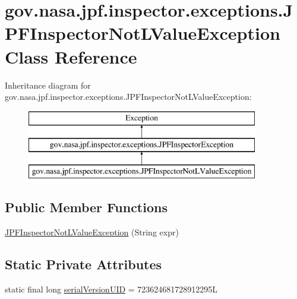 \hypertarget{classgov_1_1nasa_1_1jpf_1_1inspector_1_1exceptions_1_1_j_p_f_inspector_not_l_value_exception}{}\section{gov.\+nasa.\+jpf.\+inspector.\+exceptions.\+J\+P\+F\+Inspector\+Not\+L\+Value\+Exception Class Reference}
\label{classgov_1_1nasa_1_1jpf_1_1inspector_1_1exceptions_1_1_j_p_f_inspector_not_l_value_exception}
Inheritance diagram for gov.\+nasa.\+jpf.\+inspector.\+exceptions.\+J\+P\+F\+Inspector\+Not\+L\+Value\+Exception\+:\begin{figure}[H]
\begin{center}
\leavevmode
\includegraphics[height=3.000000cm]{classgov_1_1nasa_1_1jpf_1_1inspector_1_1exceptions_1_1_j_p_f_inspector_not_l_value_exception}
\end{center}
\end{figure}
\subsection*{Public Member Functions}
\begin{DoxyCompactItemize}
\item 
\hyperlink{classgov_1_1nasa_1_1jpf_1_1inspector_1_1exceptions_1_1_j_p_f_inspector_not_l_value_exception_af114ed6317c50a8d661247ed25c02503}{J\+P\+F\+Inspector\+Not\+L\+Value\+Exception} (String expr)
\end{DoxyCompactItemize}
\subsection*{Static Private Attributes}
\begin{DoxyCompactItemize}
\item 
static final long \hyperlink{classgov_1_1nasa_1_1jpf_1_1inspector_1_1exceptions_1_1_j_p_f_inspector_not_l_value_exception_aa2ff8a799155158520bf76069d8bacf0}{serial\+Version\+U\+ID} = 723624681728912295L
\end{DoxyCompactItemize}


